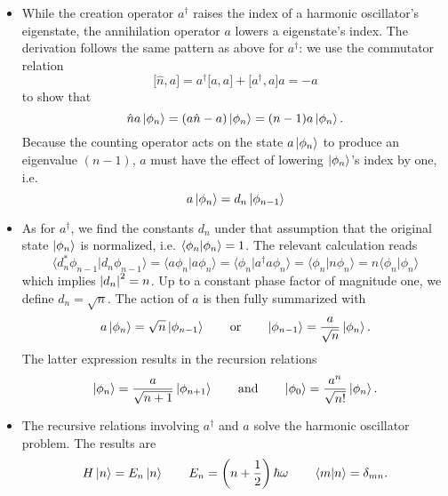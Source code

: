 \documentclass[11pt, a4paper]{article}
\newcommand{\eqtext}[1]{\qquad \text{#1} \qquad}
\newcommand{\bbraket}[2]{\big \langle {#1} \big | {#2} \big \rangle}  %
\renewcommand{\k}[1]{\ket{#1}}
\begin{document}
\begin{itemize}
	\item While the creation operator $ a^{\dagger} $ raises the index of a harmonic oscillator's eigenstate, the annihilation operator $ a $ lowers a eigenstate's index. The derivation follows the same pattern as above for $ a^{\dagger} $: we use the commutator relation
	\begin{equation*}
		\big[\hat{n}, a\big] = a^{\dagger}\big[a, a\big] + \big[a^{\dagger}, a\big]a = - a
	\end{equation*}
	to show that
	\begin{equation*}
		\hat{n}a \ket{\phi_{n}} = (a \hat{n} - a)\ket{\phi_{n}} = (n-1)a\ket{\phi_{n}}.
	\end{equation*}
	Because the counting operator acts on the state $ a\k{\phi_{n}} $ to produce an eigenvalue $ (n-1) $, $ a $ must have the effect of lowering $ \ket{\phi_{n}} $'s index by one, i.e.
	\begin{equation*}
		a\ket{\phi_{n}} = d_{n}\ket{\phi_{n-1}}
	\end{equation*}
	
	\item As for $ a^{\dagger} $, we find the constants $ d_{n} $ under that assumption that the original state $ \ket{\phi_{n}} $ is normalized, i.e. $ \braket{\phi_{n}}{\phi_{n}} = 1 $. The relevant calculation reads
 	\begin{equation*}
 		\bbraket{d_{n}^{*}\phi_{n-1}}{d_{n}\phi_{n-1}} = \bbraket{a\phi_{n}}{a\phi_{n}} = \bbraket{\phi_{n}}{a^{\dagger}a\phi_{n}} = \bbraket{\phi_{n}}{n\phi_{n}} = n \bbraket{\phi_{n}}{\phi_{n}}
 	\end{equation*}
 	which implies $ \abs{d_{n}}^{2} = n $. Up to a constant phase factor of magnitude one, we define $ d_{n} = \sqrt{n} $. The action of $ a $ is then fully summarized with
 	\begin{equation*}
 		a\k{\phi_{n}} = \sqrt{n}\ket{\phi_{n-1}} \eqtext{or} \ket{\phi_{n - 1}} = \frac{a}{\sqrt{n}}\k{\phi_{n}}. 
 	\end{equation*}
 	The latter expression results in the recursion relations
 	\begin{equation*}
 		\ket{\phi_{n}} = \frac{a}{\sqrt{n+1}}\ket{\phi_{n+1}} \eqtext{and} \ket{\phi_{0}} = \frac{a^{n}}{\sqrt{n!}}\ket{\phi_{n}}.
 	\end{equation*}
 	
 	\item The recursive relations involving $ a^{\dagger} $  and $ a $ solve the harmonic oscillator problem. The results are
 	\begin{equation*}
 		H\ket{n} = E_{n}\ket{n} \qquad E_{n} = \left(n + \frac{1}{2}\right)\hbar \omega \qquad \braket{m}{n} = \delta_{mn}.
 	\end{equation*}
	 
\end{itemize}
\end{document}
